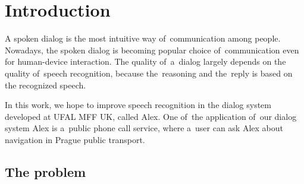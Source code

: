 \chapter{Introduction}
\label{chap:intro}

% 
% 
% 

A spoken dialog is the most intuitive way of~communication among people. Nowadays, the spoken dialog is becoming popular choice of~communication even for human-device interaction. The quality of~a~dialog largely depends on the quality of~speech recognition, because the~reasoning and the~reply is based on the recognized speech. 

In this work, we hope to improve speech recognition in the dialog system developed at \acs{UFAL} \acs{MFF} \acs{UK}, called Alex. One of~the application of~our dialog system Alex is a~public phone call service, where a~user can ask Alex about navigation in Prague public transport.

\section{The problem} 
\label{sec:why}

